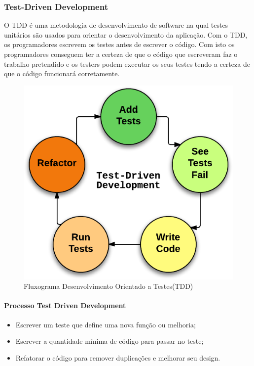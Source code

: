 \documentclass[a4paper,12pt]{article} %
\begin{document}
\subsubsection{Test-Driven Development}
O TDD é uma metodologia de desenvolvimento de software na qual testes unitários são usados para orientar o desenvolvimento da aplicação. Com o TDD, os programadores escrevem os testes antes de escrever o código. Com isto os programadores conseguem ter a certeza de que o código que escreveram faz o trabalho pretendido e os testers podem executar os seus testes tendo a certeza de que o código funcionará corretamente.

\vspace{1cm}
\begin{figure}[H]
	\centering
	\includegraphics[scale=0.35]{images/TDD.png}
	\caption{Fluxograma Desenvolvimento Orientado a Testes(TDD)}
\end{figure}

\newpage
\paragraph{Processo Test Driven Development}
\begin{itemize}
	\item Escrever um teste que define uma nova função ou melhoria;
	\item Escrever a quantidade mínima de código para passar no teste;
	\item Refatorar o código para remover duplicações e melhorar seu design.
\end{itemize}
\end{document}
